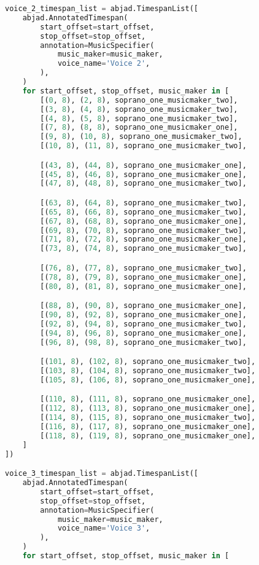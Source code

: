 \begin{lstlisting}[language=Python, caption=Invocation Source Code]
voice_2_timespan_list = abjad.TimespanList([
    abjad.AnnotatedTimespan(
        start_offset=start_offset,
        stop_offset=stop_offset,
        annotation=MusicSpecifier(
            music_maker=music_maker,
            voice_name='Voice 2',
        ),
    )
    for start_offset, stop_offset, music_maker in [
        [(0, 8), (2, 8), soprano_one_musicmaker_two],
        [(3, 8), (4, 8), soprano_one_musicmaker_two],
        [(4, 8), (5, 8), soprano_one_musicmaker_two],
        [(7, 8), (8, 8), soprano_one_musicmaker_one],
        [(9, 8), (10, 8), soprano_one_musicmaker_two],
        [(10, 8), (11, 8), soprano_one_musicmaker_two],

        [(43, 8), (44, 8), soprano_one_musicmaker_one],
        [(45, 8), (46, 8), soprano_one_musicmaker_one],
        [(47, 8), (48, 8), soprano_one_musicmaker_two],

        [(63, 8), (64, 8), soprano_one_musicmaker_two],
        [(65, 8), (66, 8), soprano_one_musicmaker_two],
        [(67, 8), (68, 8), soprano_one_musicmaker_one],
        [(69, 8), (70, 8), soprano_one_musicmaker_two],
        [(71, 8), (72, 8), soprano_one_musicmaker_one],
        [(73, 8), (74, 8), soprano_one_musicmaker_two],

        [(76, 8), (77, 8), soprano_one_musicmaker_two],
        [(78, 8), (79, 8), soprano_one_musicmaker_one],
        [(80, 8), (81, 8), soprano_one_musicmaker_one],

        [(88, 8), (90, 8), soprano_one_musicmaker_one],
        [(90, 8), (92, 8), soprano_one_musicmaker_one],
        [(92, 8), (94, 8), soprano_one_musicmaker_two],
        [(94, 8), (96, 8), soprano_one_musicmaker_one],
        [(96, 8), (98, 8), soprano_one_musicmaker_two],

        [(101, 8), (102, 8), soprano_one_musicmaker_two],
        [(103, 8), (104, 8), soprano_one_musicmaker_two],
        [(105, 8), (106, 8), soprano_one_musicmaker_one],

        [(110, 8), (111, 8), soprano_one_musicmaker_one],
        [(112, 8), (113, 8), soprano_one_musicmaker_one],
        [(114, 8), (115, 8), soprano_one_musicmaker_two],
        [(116, 8), (117, 8), soprano_one_musicmaker_one],
        [(118, 8), (119, 8), soprano_one_musicmaker_one],
    ]
])

voice_3_timespan_list = abjad.TimespanList([
    abjad.AnnotatedTimespan(
        start_offset=start_offset,
        stop_offset=stop_offset,
        annotation=MusicSpecifier(
            music_maker=music_maker,
            voice_name='Voice 3',
        ),
    )
    for start_offset, stop_offset, music_maker in [


\end{lstlisting}
